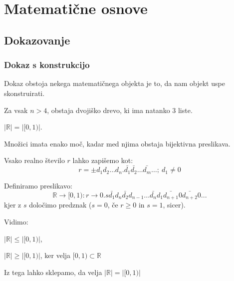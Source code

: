 \documentclass[10pt,a4paper,oneside]{book}
\begin{document}
\section{Matematične osnove}
\subsection{Dokazovanje}
\subsubsection{Dokaz s konstrukcijo}
Dokaz obstoja nekega matematičnega objekta je to, da nam objekt uspe skonstruirati.

\begin{primeri}
\item Za vsak $n>4$, obstaja dvojiško drevo, ki ima natanko $3$ liste.
\item $| \mathbb{R} | = | [0,1) |$.\\
	\begin{items}
	\item Množici imata enako moč, kadar med njima obstaja bijektivna preslikava.
	\item Vsako realno število $r$ lahko zapišemo kot:
	\begin{displaymath}
		r=\pm d_1 d_2 \dots d_n . \bar{d_1}\bar{d_2} \dots \bar{d_m} \dots ;\ d_1 \neq 0
	\end{displaymath}
	\item Definiramo preslikavo:
	\begin{displaymath}
		\mathbb{R}\rightarrow [0,1): r\rightarrow 0.s\bar{d_{1}}d_{n}\bar{d_{2}}d_{n-1}...\bar{d_{n}}d_{1}\bar{d_{n+1}}0\bar{d_{n+2}}0...
	\end{displaymath}
	kjer z $s$ določimo predznak ($s=0$, če $r \ge 0$ in $s=1$, sicer).
	\item Vidimo:
		\begin{items}
		\item $|\mathbb{R}|\le |[0,1)|$, %
		\item $|\mathbb{R}|\ge |[0,1)|$, ker velja $[0,1) \subset \mathbb{R}$
		\end{items}
	\item Iz tega lahko sklepamo, da velja $|\mathbb{R}|=|[0,1)|$
	\end{items}
\end{primeri}
	
\end{document}
